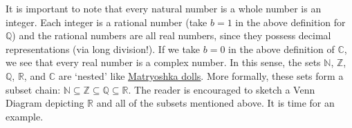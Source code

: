 \medskip


\medskip


It is important to note that every natural number is a whole number is an integer.   Each integer is a rational number (take $b =1$ in the above definition for $\mathbb Q$) and the rational numbers are all real numbers, since they possess decimal representations (via long division!). If we take $b=0$ in the above definition of $\mathbb C$, we see that every real number is a complex number.  In this sense, the sets $\mathbb N$, $\mathbb Z$, $\mathbb Q$, $\mathbb R$, and $\mathbb C$ are `nested' like \href{http://en.wikipedia.org/wiki/Matryoshka_doll}{\underline{Matryoshka dolls}}. More formally, these sets form a subset chain:  $\mathbb{N} \subseteq \mathbb Z \subseteq \mathbb{Q} \subseteq \mathbb{R}$.  The reader is encouraged to sketch a Venn Diagram depicting $\mathbb{R}$ and all of the subsets mentioned above.  It is time for an example.

\medskip


